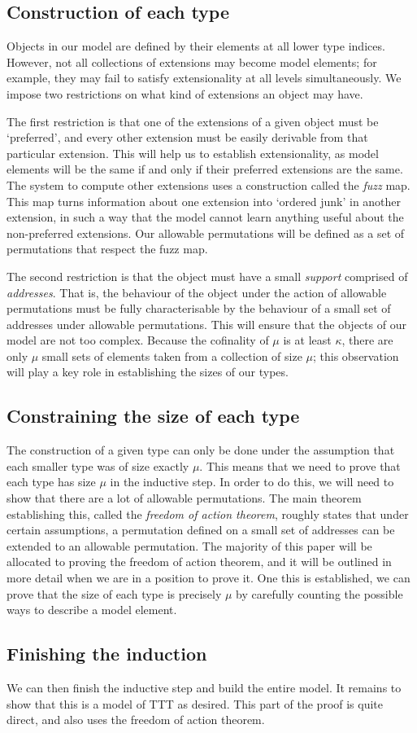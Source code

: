 \subsection{Construction of each type}

Objects in our model are defined by their elements at all lower type indices.
However, not all collections of extensions may become model elements; for example, they may fail to satisfy extensionality at all levels simultaneously.
We impose two restrictions on what kind of extensions an object may have.

The first restriction is that one of the extensions of a given object must be `preferred', and every other extension must be easily derivable from that particular extension.
This will help us to establish extensionality, as model elements will be the same if and only if their preferred extensions are the same.
The system to compute other extensions uses a construction called the \emph{fuzz} map.
This map turns information about one extension into `ordered junk' in another extension, in such a way that the model cannot learn anything useful about the non-preferred extensions.
Our allowable permutations will be defined as a set of permutations that respect the fuzz map.

The second restriction is that the object must have a small \emph{support} comprised of \emph{addresses}.
That is, the behaviour of the object under the action of allowable permutations must be fully characterisable by the behaviour of a small set of addresses under allowable permutations.
This will ensure that the objects of our model are not too complex.
Because the cofinality of \( \mu \) is at least \( \kappa \), there are only \( \mu \) small sets of elements taken from a collection of size \( \mu \); this observation will play a key role in establishing the sizes of our types.

\subsection{Constraining the size of each type}

The construction of a given type can only be done under the assumption that each smaller type was of size exactly \( \mu \).
This means that we need to prove that each type has size \( \mu \) in the inductive step.
In order to do this, we will need to show that there are a lot of allowable permutations.
The main theorem establishing this, called the \emph{freedom of action theorem}, roughly states that under certain assumptions, a permutation defined on a small set of addresses can be extended to an allowable permutation.
The majority of this paper will be allocated to proving the freedom of action theorem, and it will be outlined in more detail when we are in a position to prove it.
One this is established, we can prove that the size of each type is precisely \( \mu \) by carefully counting the possible ways to describe a model element.

\subsection{Finishing the induction}

We can then finish the inductive step and build the entire model.
It remains to show that this is a model of TTT as desired.
This part of the proof is quite direct, and also uses the freedom of action theorem.
